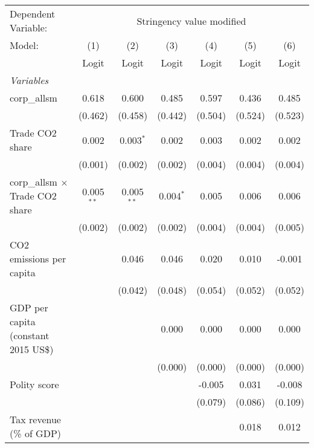 
\begingroup
\centering
\begin{tabular}{lcccccc}
   \toprule
   Dependent Variable: & \multicolumn{6}{c}{Stringency value modified}\\
   Model:                                 & (1)          & (2)          & (3)         & (4)     & (5)     & (6)\\  
                                          &  Logit       & Logit        & Logit       & Logit   & Logit   & Logit\\  
   \midrule
   \emph{Variables}\\
   corp\_allsm                            & 0.618        & 0.600        & 0.485       & 0.597   & 0.436   & 0.485\\   
                                          & (0.462)      & (0.458)      & (0.442)     & (0.504) & (0.524) & (0.523)\\   
   Trade CO2 share                        & 0.002        & 0.003$^{*}$  & 0.002       & 0.003   & 0.002   & 0.002\\   
                                          & (0.001)      & (0.002)      & (0.002)     & (0.004) & (0.004) & (0.004)\\   
   corp\_allsm $\times$ Trade CO2 share   & 0.005$^{**}$ & 0.005$^{**}$ & 0.004$^{*}$ & 0.005   & 0.006   & 0.006\\   
                                          & (0.002)      & (0.002)      & (0.002)     & (0.004) & (0.004) & (0.005)\\   
   CO2 emissions per capita               &              & 0.046        & 0.046       & 0.020   & 0.010   & -0.001\\   
                                          &              & (0.042)      & (0.048)     & (0.054) & (0.052) & (0.052)\\   
   GDP per capita (constant 2015 US\$)    &              &              & 0.000       & 0.000   & 0.000   & 0.000\\   
                                          &              &              & (0.000)     & (0.000) & (0.000) & (0.000)\\   
   Polity score                           &              &              &             & -0.005  & 0.031   & -0.008\\   
                                          &              &              &             & (0.079) & (0.086) & (0.109)\\   
   Tax revenue (\% of GDP)                &              &              &             &         & 0.018   & 0.012\\   

\end{tabular}
